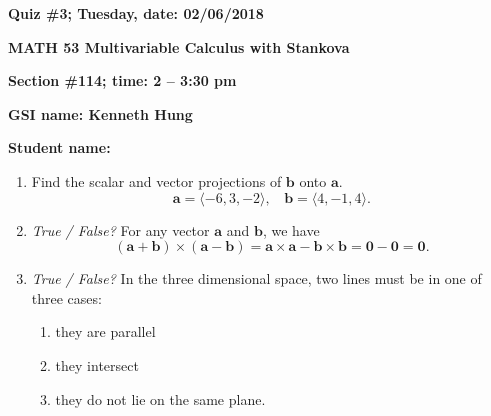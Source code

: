 \documentclass{article}
\begin{document}
{\bf Quiz \#3; Tuesday, date: 02/06/2018}

{\bf MATH 53 Multivariable Calculus with Stankova}

{\bf Section \#114; time: 2 -- 3:30 pm}

{\bf GSI name: Kenneth Hung}

{\bf Student name:}

\vspace*{0.25in}

\begin{enumerate}
\item Find the scalar and vector projections of $\mathbf{b}$ onto $\mathbf{a}$.
\[
\mathbf{a} = \langle -6, 3, -2\rangle , ~~~~ \mathbf{b} = \langle 4, -1, 4\rangle.
\]

\item {\em True / False?} For any vector $\mathbf{a}$ and $\mathbf{b}$, we have
\[
(\mathbf{a} + \mathbf{b}) \times (\mathbf{a} - \mathbf{b}) = \mathbf{a} \times \mathbf{a} - \mathbf{b} \times \mathbf{b} = \mathbf{0} - \mathbf{0} = \mathbf{0}.
\]

\item {\em True / False?} In the three dimensional space, two lines must be in one of three cases:
\begin{enumerate}
\item they are parallel
\item they intersect
\item they do not lie on the same plane.
\end{enumerate}
\end{enumerate}
\end{document}
